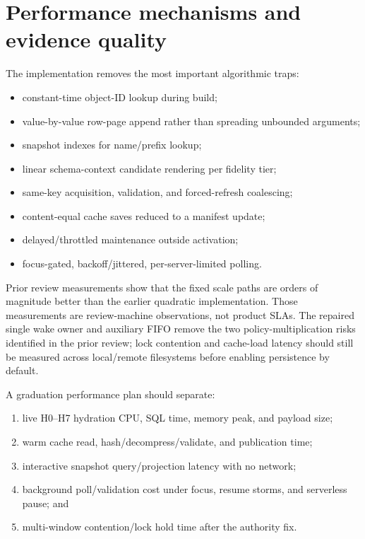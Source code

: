\documentclass[11pt]{article}
\begin{document}
\section{Performance mechanisms and evidence quality}

The implementation removes the most important algorithmic traps:

\begin{itemize}
  \item constant-time object-ID lookup during build;
  \item value-by-value row-page append rather than spreading unbounded arguments;
  \item snapshot indexes for name/prefix lookup;
  \item linear schema-context candidate rendering per fidelity tier;
  \item same-key acquisition, validation, and forced-refresh coalescing;
  \item content-equal cache saves reduced to a manifest update;
  \item delayed/throttled maintenance outside activation;
  \item focus-gated, backoff/jittered, per-server-limited polling.
\end{itemize}

Prior review measurements show that the fixed scale paths are orders of magnitude better than the earlier quadratic implementation. Those measurements are review-machine observations, not product SLAs. The repaired single wake owner and auxiliary FIFO remove the two policy-multiplication risks identified in the prior review; lock contention and cache-load latency should still be measured across local/remote filesystems before enabling persistence by default.

A graduation performance plan should separate:

\begin{enumerate}
  \item live H0--H7 hydration CPU, SQL time, memory peak, and payload size;
  \item warm cache read, hash/decompress/validate, and publication time;
  \item interactive snapshot query/projection latency with no network;
  \item background poll/validation cost under focus, resume storms, and serverless pause; and
  \item multi-window contention/lock hold time after the authority fix.
\end{enumerate}
\end{document}
